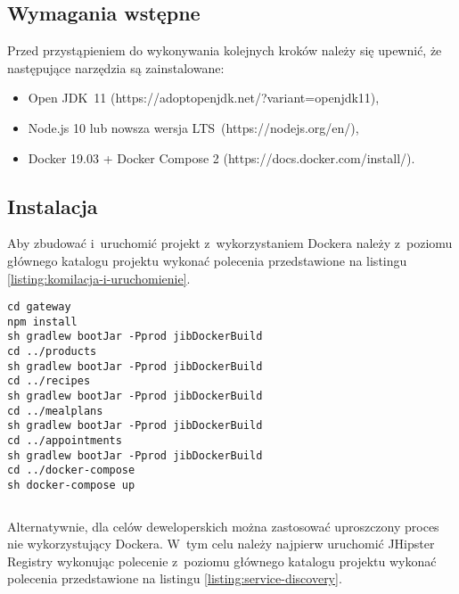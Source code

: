 \subsection{Wymagania wstępne}\label{subsec:prerequirements}
Przed przystąpieniem do wykonywania kolejnych kroków należy się upewnić, że następujące narzędzia są zainstalowane:
\begin{itemize}
    \item Open JDK~11 (https://adoptopenjdk.net/?variant=openjdk11),
    \item Node.js 10 lub nowsza wersja LTS~(https://nodejs.org/en/),
    \item Docker 19.03 + Docker Compose 2 (https://docs.docker.com/install/).
\end{itemize}

\subsection{Instalacja}\label{subsec:installation}

Aby zbudować i~uruchomić projekt z~wykorzystaniem Dockera należy z~poziomu głównego katalogu projektu
wykonać polecenia przedstawione na listingu \ref{listing:komilacja-i-uruchomienie}.

\noindent\hspace{.075\textwidth}\begin{minipage}{.85\textwidth}
    \begin{verbatim}
cd gateway
npm install
sh gradlew bootJar -Pprod jibDockerBuild
cd ../products
sh gradlew bootJar -Pprod jibDockerBuild
cd ../recipes
sh gradlew bootJar -Pprod jibDockerBuild
cd ../mealplans
sh gradlew bootJar -Pprod jibDockerBuild
cd ../appointments
sh gradlew bootJar -Pprod jibDockerBuild
cd ../docker-compose
sh docker-compose up
    \end{verbatim}
    \begin{lstlisting}[caption={Skrypt kompilujący wszystkie mikroserwisy i~uruchamiający aplikację na Dockerze \source{\ownwork}}, label={listing:komilacja-i-uruchomienie}]
\end{lstlisting}
\end{minipage}

Alternatywnie, dla celów deweloperskich można zastosować uproszczony proces nie wykorzystujący Dockera.
W~tym celu należy najpierw uruchomić JHipster Registry wykonując polecenie z~poziomu głównego katalogu projektu
wykonać polecenia przedstawione na listingu \ref{listing:service-discovery}.

